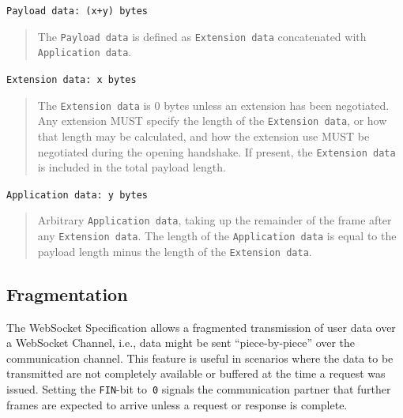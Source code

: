 \documentclass[a4paper, justified, notoc]{tufte-handout} %
\begin{document}
\noindent   \texttt{Payload data:  (x+y) bytes}
\begin{quote}
      The \texttt{Payload data} is defined as \texttt{Extension data} concatenated
      with \texttt{Application data}.
\end{quote}

\noindent   \texttt{Extension data:  x bytes}
\begin{quote}
      The \texttt{Extension data} is 0 bytes unless an extension has been
      negotiated.  Any extension MUST specify the length of the
      \texttt{Extension data}, or how that length may be calculated, and how
      the extension use MUST be negotiated during the opening handshake.
      If present, the \texttt{Extension data} is included in the total payload
      length.
\end{quote}

\noindent   \texttt{Application data:  y bytes}
\begin{quote}
      Arbitrary \texttt{Application data}, taking up the remainder of the frame
      after any \texttt{Extension data}.  The length of the \texttt{Application data}
      is equal to the payload length minus the length of the \texttt{Extension data}.
\end{quote}


%




\subsection{Fragmentation} %
\label{sub:fragmentation}
The WebSocket Specification allows a fragmented transmission of user data over a WebSocket Channel, i.e., data might be sent ``piece-by-piece'' over the communication channel. This feature is useful in scenarios where the data to be transmitted are not completely available or buffered at the time a request was issued. Setting the \texttt{FIN}-bit to~\texttt{0} signals the communication partner that further frames are expected to arrive unless a request or response is complete. 
\end{document}
